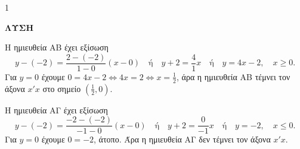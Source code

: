 \begin{ylh}{1}
    \item [Ύλη από εικόνα]
\end{ylh}
\textbf{ΛΥΣΗ}

\begin{alist}
    \item Η ημιευθεία ΑΒ έχει εξίσωση
    \[ y - (-2) = \frac{2 - (-2)}{1 - 0} (x - 0) \quad \text{ή} \quad y + 2 = \frac{4}{1} x \quad \text{ή} \quad y = 4x - 2, \quad x \ge 0. \]
    Για $y = 0$ έχουμε $0 = 4x - 2 \Leftrightarrow 4x = 2 \Leftrightarrow x = \frac{1}{2}$,
    άρα η ημιευθεία ΑΒ τέμνει τον άξονα $x'x$ στο σημείο $(\frac{1}{2}, 0)$.

    Η ημιευθεία ΑΓ έχει εξίσωση
    \[ y - (-2) = \frac{-2 - (-2)}{-1 - 0} (x - 0) \quad \text{ή} \quad y + 2 = \frac{0}{-1} x \quad \text{ή} \quad y = -2, \quad x \le 0. \]
    Για $y = 0$ έχουμε $0 = -2$, άτοπο. Άρα η ημιευθεία ΑΓ δεν τέμνει τον άξονα $x'x$.


\end{alist}
